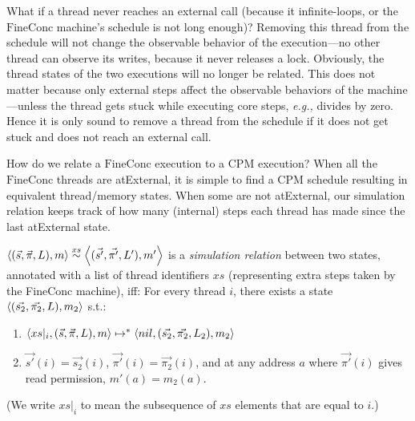 What if a thread never reaches an
external call (because it infinite-loops, or the
$\mathrm{FineConc}$ machine's schedule is not long enough)?
Removing this thread from the schedule will not change
the observable behavior of the execution---no other
thread can observe its writes, because it never releases a lock.
Obviously,
the thread states of the two executions will no longer be related.
This does not matter because only
external steps affect the observable behaviors of the machine---unless
the thread gets stuck while executing core steps,
\emph{e.g.,} divides by zero. Hence it is only sound to
remove a thread from the schedule if it does not get stuck and does
not reach an external call.

How do we relate
a $\mathrm{FineConc}$ execution to a $\mathrm{CPM}$ execution?
When all the $\mathrm{FineConc}$ threads are
atExternal, it is simple to find a $\mathrm{CPM}$ schedule
resulting in equivalent thread/memory states.
When some are not atExternal,
our simulation relation keeps track of how many (internal) steps
each thread has made since the last atExternal state.

\newcommand\ren{\mathrm{r}}
\newcommand\blockt{\mathrm{block}}

\newcommand\filter[2]{#1 |_{#2}}

\begin{definition}
  \label{def:sim-no-renaming}
  $\left<(\vec{s}, \vec{\pi}, L), m \right>
  \stackrel{xs}{\sim} \left<(\vec{s'}, \vec{\pi'},
  L'), m'\right>$  is a   \emph{simulation relation} between two
  states, annotated with a list of thread identifiers $xs$ (representing
  extra steps taken by the FineConc machine),  iff:
  For every thread $i$, there exists a state
  $\left<(\vec{s_2}, \vec{\pi_2}, L), m_2\right>$ s.t.:
  \begin{enumerate}[topsep=0pt]
  \item
    $\left<\filter{xs}{i},(\vec{s}, \vec{\pi}, \lockpool), m \right> \mapsto^{*} \left<nil,(\vec{s_2}, \vec{\pi_2}, \lockpool_2), m_2\right>$
  \item $\vec{s'}(i)=\vec{s_2}(i)$, $\vec{\pi'}(i)=\vec{\pi_2}(i)$,
    and at any address $a$ where $\vec{\pi'}(i)$ gives read permission,
    $m'(a)=m_2(a)$.
  \end{enumerate}
  (We write $\filter{xs}{i}$ to mean the subsequence of $xs$ elements
  that are equal to $i$.)
\end{definition}


